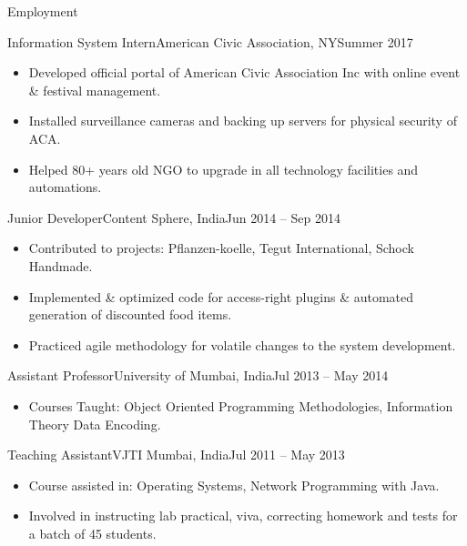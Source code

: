 \documentclass[]{mcdowellcv}
\begin{document}
	\makeheader
	\begin{cvsection}{Employment}
		\begin{cvsubsection}{Information System Intern}{American Civic Association, NY}{Summer 2017}
			\begin{itemize}
				\item Developed official portal of American Civic Association Inc with online event \& festival management.
				\item Installed surveillance cameras and backing up servers for physical security of ACA.
				\item Helped 80+ years old NGO to upgrade in all technology facilities and automations.
			\end{itemize}
		\end{cvsubsection}
		
		\begin{cvsubsection}{Junior Developer}{Content Sphere, India}{Jun 2014 -- Sep 2014}	
			\begin{itemize}
				\item Contributed to projects: Pflanzen-koelle, Tegut International, Schock Handmade.
				\item Implemented \& optimized code for access-right plugins \& automated generation of discounted food items.
				\item Practiced agile methodology for volatile changes to the system development.
			\end{itemize}
		\end{cvsubsection}

		\begin{cvsubsection}{Assistant Professor}{University of Mumbai, India}{Jul 2013 -- May 2014}		
			\begin{itemize}
				\item Courses Taught: Object Oriented Programming Methodologies, Information Theory Data Encoding.
			\end{itemize}
		\end{cvsubsection}

		\begin{cvsubsection}{Teaching Assistant}{VJTI Mumbai, India}{Jul 2011 -- May 2013}	
			\begin{itemize}
				\item Course assisted in: Operating Systems, Network Programming with Java.
				\item Involved in instructing lab practical, viva, correcting homework and tests for a batch of 45 students.
			\end{itemize}
		\end{cvsubsection}
		

\end{cvsection}
\end{document}
